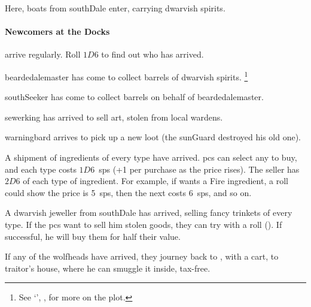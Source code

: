 \begin{multicols}{2}

Here, boats from \gls{southDale} enter, carrying dwarvish spirits.

\paragraph{Newcomers at the Docks}
arrive regularly.
Roll $1D6$ to find out who has arrived.

\begin{dlist}
  \item
  \Gls{beardedalemaster} has come to collect barrels of dwarvish spirits.%
  \footnote{See `', , for more on the plot.}
  \item
  \Gls{southSeeker} has come to collect barrels on behalf of \gls{beardedalemaster}.
  \item
  \Gls{sewerking} has arrived to sell art, stolen from local \glspl{warden}.
  \item
  \Gls{warningbard} arrives to pick up a new loot (the \gls{sunGuard} destroyed his old one).
  \item
  A shipment of \glspl{ingredient} of every type have arrived.
  \Glspl{pc} can select any to buy, and each type costs $1D6$~\glspl{sp} (+1 per purchase as the price rises).
  The seller has $2D6$ of each type of \gls{ingredient}.
  For example, if  wants a Fire \gls{ingredient}, a roll could show the price is 5~\glspl{sp}, then the next costs 6~\glspl{sp}, and so on.
  \item
  A dwarvish jeweller from \gls{southDale} has arrived, selling fancy trinkets of every type.
  If the \glspl{pc} want to sell him stolen goods, they can try with a  roll (\tn[12]).
  If successful, he will buy them for half their value.
\end{dlist}

If any of the \glspl{wolfhead} have arrived, they journey back to , with a cart, to \gls{traitor}'s house, where he can smuggle it inside, tax-free.



\end{multicols}
